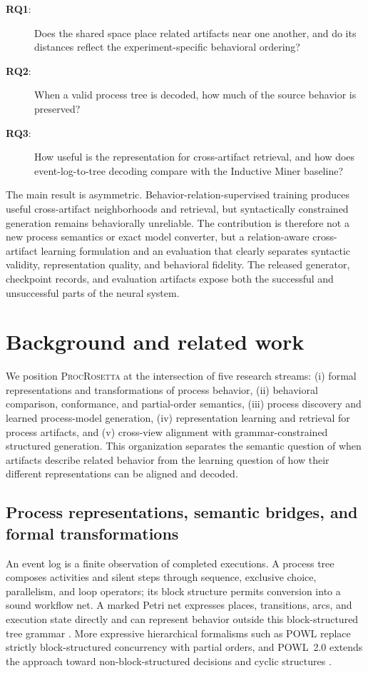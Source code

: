 \documentclass[pdflatex,sn-basic]{sn-jnl}
\newcommand{\model}{\textsc{ProcRosetta}\xspace}
\newcommand{\RQone}{\textbf{RQ1}}
\newcommand{\RQtwo}{\textbf{RQ2}}
\newcommand{\RQthree}{\textbf{RQ3}}
\begin{document}
\begin{description}
\item[\RQone:] Does the shared space place related artifacts near one another, and do its distances reflect the experiment-specific behavioral ordering?
\item[\RQtwo:] When a valid process tree is decoded, how much of the source behavior is preserved?
\item[\RQthree:] How useful is the representation for cross-artifact retrieval, and how does event-log-to-tree decoding compare with the Inductive Miner baseline?
\end{description}

The main result is asymmetric. Behavior-relation-supervised training produces useful cross-artifact neighborhoods and retrieval, but syntactically constrained generation remains behaviorally unreliable. The contribution is therefore not a new process semantics or exact model converter, but a relation-aware cross-artifact learning formulation and an evaluation that clearly separates syntactic validity, representation quality, and behavioral fidelity. The released generator, checkpoint records, and evaluation artifacts expose both the successful and unsuccessful parts of the neural system.

\section{Background and related work}\label{sec:related}

We position \model at the intersection of five research streams: (i) formal representations and transformations of process behavior, (ii) behavioral comparison, conformance, and partial-order semantics, (iii) process discovery and learned process-model generation, (iv) representation learning and retrieval for process artifacts, and (v) cross-view alignment with grammar-constrained structured generation. This organization separates the semantic question of when artifacts describe related behavior from the learning question of how their different representations can be aligned and decoded.

\subsection{Process representations, semantic bridges, and formal transformations}

An event log is a finite observation of completed executions. A process tree composes activities and silent steps through sequence, exclusive choice, parallelism, and loop operators; its block structure permits conversion into a sound workflow net. A marked Petri net expresses places, transitions, arcs, and execution state directly and can represent behavior outside this block-structured tree grammar \citep{vanDerAalst2016}. More expressive hierarchical formalisms such as POWL replace strictly block-structured concurrency with partial orders, and POWL~2.0 extends the approach toward non-block-structured decisions and cyclic structures \citep{Kourani2023POWL,Kourani2026}.
\end{document}
